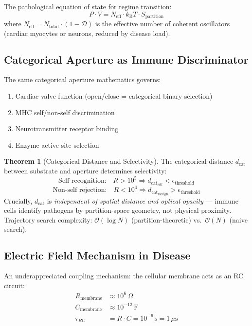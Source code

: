 \documentclass[10pt,twocolumn,a4paper]{article}
\theoremstyle{definition}
\newtheorem{theorem}{Theorem}
\newcommand{\kBT}{k_{\text{B}}T}
\newcommand{\dcat}{d_{\text{cat}}}
\begin{document}
The pathological equation of state for regime transition:
\begin{equation}
P \cdot V = N_{\text{eff}} \cdot \kBT \cdot S_{\text{partition}}
\end{equation}
where $N_{\text{eff}} = N_{\text{total}} \cdot (1 - \mathcal{D})$ is the effective
number of coherent oscillators (cardiac myocytes or neurons, reduced by disease load).

\subsection{Categorical Aperture as Immune Discriminator}

The same categorical aperture mathematics governs:
\begin{enumerate}
\item Cardiac valve function (open/close = categorical binary selection)
\item MHC self/non-self discrimination
\item Neurotransmitter receptor binding
\item Enzyme active site selection
\end{enumerate}

\begin{theorem}[Categorical Distance and Selectivity]
The categorical distance $\dcat$ between substrate and aperture determines selectivity:
\begin{equation}
\text{Self-recognition:}\quad R > 10^5 \Rightarrow \dcat_{\text{self}} < \epsilon_{\text{threshold}}
\end{equation}
\begin{equation}
\text{Non-self rejection:}\quad R < 10^4 \Rightarrow \dcat_{\text{foreign}} > \epsilon_{\text{threshold}}
\end{equation}
Crucially, $\dcat$ is \emph{independent of spatial distance and optical opacity} —
immune cells identify pathogens by partition-space geometry, not physical proximity.
Trajectory search complexity: $\mathcal{O}(\log N)$ (partition-theoretic)
vs.\ $\mathcal{O}(N)$ (naive search).
\end{theorem}

\subsection{Electric Field Mechanism in Disease}

An underappreciated coupling mechanism: the cellular membrane acts as an RC circuit:
\begin{align}
R_{\text{membrane}} &\approx 10^6\,\Omega\\
C_{\text{membrane}} &\approx 10^{-12}\,\text{F}\\
\tau_{RC} &= R \cdot C = 10^{-6}\,\text{s} = 1\,\mu\text{s}
\end{align}
\end{document}
